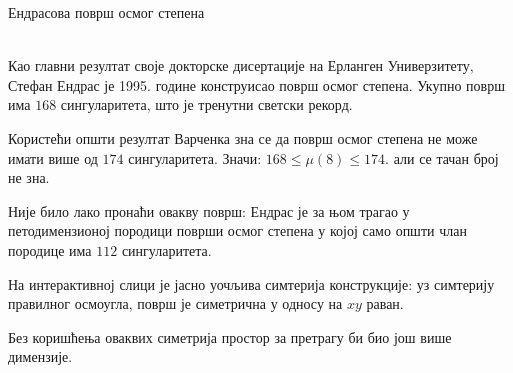 ﻿\documentclass[en]{./../../common/SurferDesc}%
\begin{document}
\footnotesize




\begin{surferPage}
  \begin{surferTitle}Ендрасова површ осмог степена\end{surferTitle} \\
    Као главни резултат своје докторске дисертације на Ерланген Универзитету, 
	Стефан Ендрас је 1995. године конструисао површ осмог степена.
    Укупно површ има $168$ сингуларитета, што је тренутни светски рекорд. 
  
    Користећи општи резултат Варченка зна се да површ осмог степена не може имати 
    више од  $174$ сингуларитета.
    Значи: $168 \le \mu(8) \le 174$. 
    али се тачан број не зна.

    Није било лако пронаћи овакву површ: Ендрас је за њом трагао у петодимензионој 
    породици површи осмог степена у којој само општи члан породице има 
    $112$ сингуларитета.

    На интерактивној слици је јасно уочљива симтерија конструкције: 
    уз симтерију правилног осмоугла, површ је симетрична у односу на $xy$ раван.

    Без коришћења оваквих симетрија простор за претрагу би био још више димензије.
  \begin{surferText}
     \end{surferText}
\end{surferPage}
\end{document}
